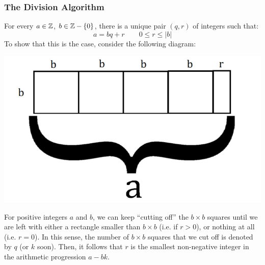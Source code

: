 \documentclass[letterpaper]{article}
\begin{document}
\subsubsection{The Division Algorithm}
For every $a \in \mathbb{Z}$, $b \in \mathbb{Z} - \{0\}$, there is a unique pair $(q, r)$ of integers such that:
\[a = bq + r \qquad 0 \leq r \leq |b|\]
To show that this is the case, consider the following diagram:
\begin{center}
    \includegraphics[scale=0.4]{img/mod_div.PNG}
\end{center}
For positive integers $a$ and $b$, we can keep ``cutting off'' the $b \times b$ squares until we are left with either a rectangle smaller than $b \times b$ (i.e. if $r > 0$), or nothing at all (i.e. $r = 0$). In this sense, the number of $b \times b$ squares that we cut off is denoted by $q$ (or $k$ soon). Then, it follows that $r$ is the smallest non-negative integer in the arithmetic progression $a - bk$.

\bigskip 
\end{document}
